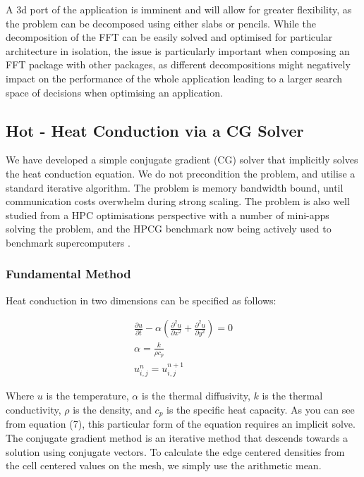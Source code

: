 \documentclass[runningheads,a4paper]{llncs}
\begin{document}
A 3d port of the application is imminent and will allow for greater flexibility, as the problem can be decomposed using either slabs or pencils. While the decomposition of the FFT can be easily solved and optimised for particular architecture in isolation, the issue is particularly important when composing an FFT package with other packages, as different decompositions might negatively impact on the performance of the whole application leading to a larger search space of decisions when optimising an application.

\subsection{Hot - Heat Conduction via a CG Solver}

\label{sec:hot}

We have developed a simple conjugate gradient (CG) solver that implicitly solves the heat conduction equation. We do not precondition the problem, and utilise a standard iterative algorithm. The problem is memory bandwidth bound, until communication costs overwhelm during strong scaling. The problem is also well studied from a HPC optimisations perspective with a number of mini-apps solving the problem, and the HPCG benchmark now being actively used to benchmark supercomputers \cite{}.

\subsubsection{Fundamental Method}

Heat conduction in two dimensions can be specified as follows:

\begin{align}
  \frac{\partial u}{\partial t} - \alpha (\frac{\partial^2u}{\partial x^2} + \frac{\partial^2u}{\partial y^2}) = 0 \\ 
  \alpha = \frac{k}{\rho c_p} \\
  u^n_{i,j} = u^{n+1}_{i,j}
\end{align}

Where $u$ is the temperature, $\alpha$ is the thermal diffusivity, $k$ is the thermal conductivity, $\rho$ is the density, and $c_p$ is the specific heat capacity. As you can see from equation (7), this particular form of the equation requires an implicit solve. The conjugate gradient method is an iterative method that descends towards a solution using conjugate vectors. To calculate the edge centered densities from the cell centered values on the mesh, we simply use the arithmetic mean.
\end{document}
